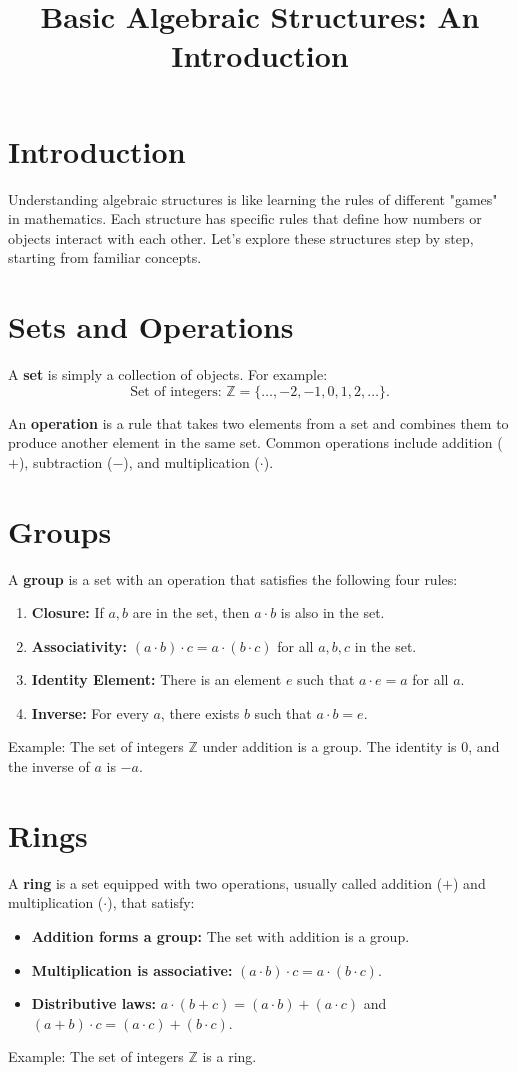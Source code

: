 \documentclass[12pt]{article}
\title{Basic Algebraic Structures: An Introduction}
\author{}
\date{}
\begin{document}
\maketitle

\section*{Introduction}
Understanding algebraic structures is like learning the rules of different "games" in mathematics. Each structure has specific rules that define how numbers or objects interact with each other. Let’s explore these structures step by step, starting from familiar concepts.

\section{Sets and Operations}
A \textbf{set} is simply a collection of objects. For example:
\[ \text{Set of integers: } \mathbb{Z} = \{ \dots, -2, -1, 0, 1, 2, \dots \}. \]

An \textbf{operation} is a rule that takes two elements from a set and combines them to produce another element in the same set. Common operations include addition ($+$), subtraction ($-$), and multiplication ($\cdot$).

\section{Groups}
A \textbf{group} is a set with an operation that satisfies the following four rules:
\begin{enumerate}
    \item \textbf{Closure:} If $a, b$ are in the set, then $a \cdot b$ is also in the set.
    \item \textbf{Associativity:} $(a \cdot b) \cdot c = a \cdot (b \cdot c)$ for all $a, b, c$ in the set.
    \item \textbf{Identity Element:} There is an element $e$ such that $a \cdot e = a$ for all $a$.
    \item \textbf{Inverse:} For every $a$, there exists $b$ such that $a \cdot b = e$.
\end{enumerate}
Example: The set of integers $\mathbb{Z}$ under addition is a group. The identity is $0$, and the inverse of $a$ is $-a$.

\section{Rings}
A \textbf{ring} is a set equipped with two operations, usually called addition ($+$) and multiplication ($\cdot$), that satisfy:
\begin{itemize}
    \item \textbf{Addition forms a group:} The set with addition is a group.
    \item \textbf{Multiplication is associative:} $(a \cdot b) \cdot c = a \cdot (b \cdot c)$.
    \item \textbf{Distributive laws:} $a \cdot (b + c) = (a \cdot b) + (a \cdot c)$ and $(a + b) \cdot c = (a \cdot c) + (b \cdot c)$.
\end{itemize}
Example: The set of integers $\mathbb{Z}$ is a ring.
\end{document}
